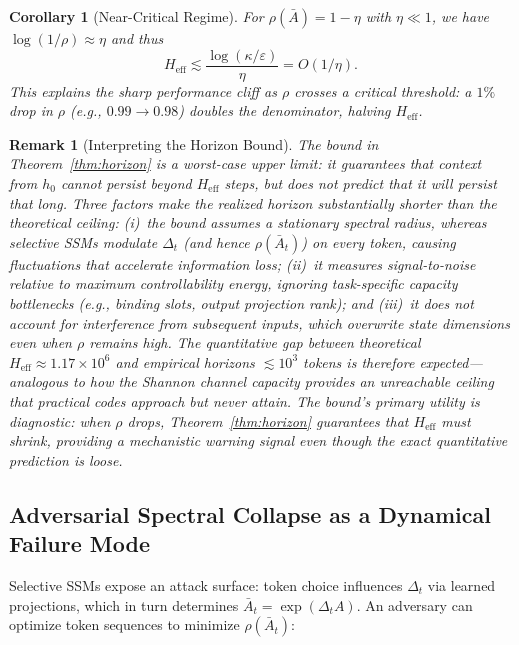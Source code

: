\documentclass[10pt,twocolumn]{article}
\newtheorem{corollary}[theorem]{Corollary}
\newtheorem{remark}{Remark}
\begin{document}
\begin{corollary}[Near-Critical Regime]
\label{cor:nearcritical}
For $\rho(\bar{A}) = 1 - \eta$ with $\eta \ll 1$, we have $\log(1/\rho) \approx \eta$ and thus
\begin{equation}
H_{\text{eff}} \lesssim \frac{\log(\kappa/\varepsilon)}{\eta} = O(1/\eta).
\label{eq:horizon_nearcritical}
\end{equation}
This explains the sharp performance cliff as $\rho$ crosses a critical threshold: a $1\%$ drop in $\rho$ (e.g., $0.99\to 0.98$) doubles the denominator, halving $H_{\text{eff}}$.
\end{corollary}

\begin{remark}[Interpreting the Horizon Bound]
\label{rem:horizon_interpretation}
The bound in Theorem~\ref{thm:horizon} is a \emph{worst-case upper limit}: it guarantees that context from $h_0$ \emph{cannot} persist beyond $H_{\text{eff}}$ steps, but does not predict that it \emph{will} persist that long. Three factors make the realized horizon substantially shorter than the theoretical ceiling: (i)~the bound assumes a \emph{stationary} spectral radius, whereas selective SSMs modulate $\Delta_t$ (and hence $\rho(\bar{A}_t)$) on every token, causing fluctuations that accelerate information loss; (ii)~it measures signal-to-noise relative to maximum controllability energy, ignoring task-specific capacity bottlenecks (e.g., binding slots, output projection rank); and (iii)~it does not account for interference from subsequent inputs, which overwrite state dimensions even when $\rho$ remains high. The quantitative gap between theoretical $H_{\text{eff}} \approx 1.17 \times 10^6$ and empirical horizons $\lesssim 10^3$ tokens is therefore \emph{expected}---analogous to how the Shannon channel capacity provides an unreachable ceiling that practical codes approach but never attain. The bound's primary utility is \emph{diagnostic}: when $\rho$ drops, Theorem~\ref{thm:horizon} guarantees that $H_{\text{eff}}$ \emph{must} shrink, providing a mechanistic warning signal even though the exact quantitative prediction is loose.
\end{remark}

\subsection{Adversarial Spectral Collapse as a Dynamical Failure Mode}

Selective SSMs expose an attack surface: token choice influences $\Delta_t$ via learned projections, which in turn determines $\bar{A}_t = \exp(\Delta_t A)$. An adversary can optimize token sequences to minimize $\rho(\bar{A}_t)$:
\end{document}
